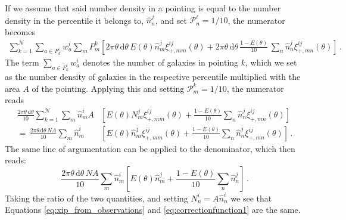 \documentclass{aa}
\renewcommand{\rm}{\mathrm}
\def\d{\rm{d}}
\begin{document}
\begin{appendix}
If we assume that said number density in a pointing is equal to the number density in the percentile it belongs to, $\hat{n}_n^j$, and set $\mathcal{P}_n^\ell=1/10$, the numerator becomes \begin{align}
\sum_{k=1}^\mathcal{N} \sum_{a\in F_k^i} w_a^i \sum_m P^k_m \left[2\pi\theta\,\d\theta\,E(\theta) \hat{n}_m^j \xi_{+,mm}^{ij}(\theta) + 2\pi\theta\,\d\theta\,\frac{1-E(\theta)}{10}\, \sum_n \hat{n}_n^j \xi_{+,mn}^{ij}(\theta) \right] \, .
\end{align}
The term $\sum_{a\in F_k^i} w_a^i$ denotes the number of galaxies in pointing $k$, which we set as the number density of galaxies in the respective percentile multiplied with the area $A$ of the pointing. Applying this and setting $\mathcal{P}_m^k=1/10$, the numerator reads 
\begin{align}
\frac{2\pi\theta\,\d\theta}{10} \sum_{k=1}^\mathcal{N} \sum_m \hat{n}_m^i A &\left[ E(\theta) N_m^j \xi_{+,mm}^{ij}(\theta) + \frac{1-E(\theta)}{10}\sum_n \hat{n}_n^j\xi_{+,mn}^{ij}(\theta)\right] \nonumber\\
 =  \, \frac{2\pi\theta\,\d\theta \, NA}{10}  \sum_m \hat{n}_m^i &\left[ E(\theta) \hat{n}_m^j \xi_{+,mm}^{ij}(\theta) + \frac{1-E(\theta)}{10}\sum_n \hat{n}_n^j\xi_{+,mn}^{ij}(\theta)\right] \, .
\end{align}
%
 The same line of argumentation can be applied to the denominator, which then reads: \begin{equation}
\frac{2\pi\theta\,\d\theta \, NA}{10}  \sum_m \hat{n}_m^i \left[ E(\theta) \hat{n}_m^j + \frac{1-E(\theta)}{10}\sum_n \hat{n}_n^j\right]\, .
 \end{equation}
Taking the ratio of the two quantities, and setting $N_n^i = A\hat{n}_n^i$ we see that Equations \eqref{eq:xip_from_observations} and \eqref{eq:correctionfunction1} are the same.

\end{appendix}
\end{document}
